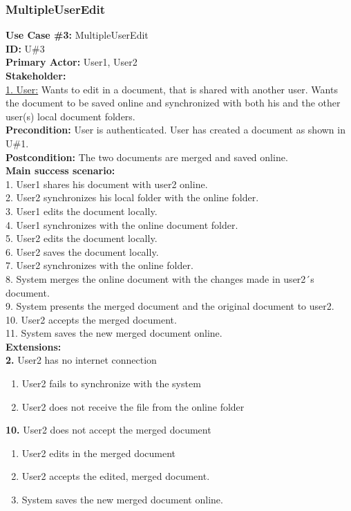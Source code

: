 \subsubsection{MultipleUserEdit}
\textbf{Use Case \#3:} MultipleUserEdit\\
\textbf{ID:} U\#3\\
\textbf{Primary Actor:} User1, User2\\
\textbf{Stakeholder:}\\
\underline{1. User:} Wants to edit in a document, that is shared with another user. Wants the document to be saved online and synchronized with both his and the other user(s) local document folders.\\
\newline
\textbf{Precondition:} User is authenticated. User has created a document as shown in U\#1.\\
\textbf{Postcondition:} The two documents are merged and saved online.\\
\newline
\textbf{Main success scenario:}\\
1. User1 shares his document with user2 online.\\
2. User2 synchronizes his local folder with the online folder.\\
3. User1 edits the document locally.\\
4. User1 synchronizes with the online document folder.\\
5. User2 edits the document locally.\\
6. User2 saves the document locally.\\
7. User2 synchronizes with the online folder.\\
8. System merges the online document with the changes made in user2´s document.\\
9. System presents the merged document and the original document to user2.\\
10. User2 accepts the merged document.\\
11. System saves the new merged document online.\\
\newline
\textbf{Extensions:}\\
\textbf{2.} User2 has no internet connection
\begin{enumerate}
\item User2 fails to synchronize with the system
\item User2 does not receive the file from the online folder
\end{enumerate}
\textbf{10.} User2 does not accept the merged document
\begin{enumerate}
\item User2 edits in the merged document
\item User2 accepts the edited, merged document.
\item System saves the new merged document online.
\end{enumerate}
